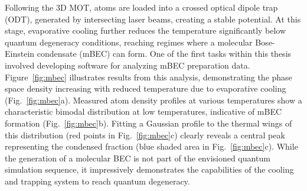 Following the 3D MOT, atoms are loaded into a crossed optical dipole trap (ODT), generated by intersecting laser beams, creating a stable potential. At this stage, evaporative cooling further reduces the temperature significantly below quantum degeneracy conditions, reaching regimes where a molecular Bose-Einstein condensate (mBEC) can form. One of the first tasks within this thesis involved developing software for analyzing mBEC preparation data. Figure~\ref{fig:mbec} illustrates results from this analysis, demonstrating the phase space density increasing with reduced temperature due to evaporative cooling (Fig.~\ref{fig:mbec}a). Measured atom density profiles at various temperatures show a characteristic bimodal distribution at low temperatures, indicative of mBEC formation (Fig.~\ref{fig:mbec}b). Fitting a Gaussian profile to the thermal wings of this distribution (red points in Fig.~\ref{fig:mbec}c) clearly reveals a central peak representing the condensed fraction (blue shaded area in Fig.~\ref{fig:mbec}c). While the generation of a molecular BEC is not part of the envisioned quantum simulation sequence, it impressively demonstrates the capabilities of the cooling and trapping system to reach quantum degeneracy.

